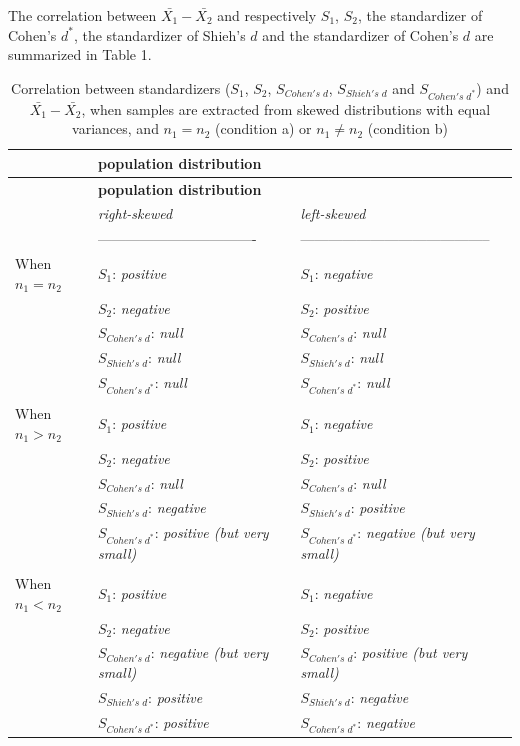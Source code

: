 \documentclass[
  english,
  man,mask]{apa6}
\begin{document}
The correlation between \(\bar{X_1}-\bar{X_2}\) and respectively \(S_1\), \(S_2\), the standardizer of Cohen's \(d^*\), the standardizer of Shieh's \(d\) and the standardizer of Cohen's \(d\) are summarized in Table 1.

\begin{longtable}[]{@{}
  >{\raggedright\arraybackslash}p{}
  >{\centering\arraybackslash}p{}
  >{\centering\arraybackslash}p{}@{}}
\caption{Correlation between standardizers (\(S_1\), \(S_2\), \(S_{Cohen's \; d}\), \(S_{Shieh's \; d}\) and \(S_{Cohen's \; d^*}\)) and \(\bar{X_1}-\bar{X_2}\), when samples are extracted from skewed distributions with equal variances, and \(n_1=n_2\) (condition a) or \(n_1 \neq n_2\) (condition b)}\tabularnewline
\toprule
& \textbf{\textbf{population distribution}} & \\
\midrule
\endfirsthead
\toprule
& \textbf{\textbf{population distribution}} & \\
\midrule
\endhead
& \emph{right-skewed} & \emph{left-skewed} \\
& ---------------------------------- & ----------------------------------------- \\
When \(n_1=n_2\) & \(S_1\): \emph{positive} & \(S_1\): \emph{negative} \\
& \(S_2\): \emph{negative} & \(S_2\): \emph{positive} \\
& \(S_{Cohen's \; d}\): \emph{null} & \(S_{Cohen's \; d}\): \emph{null} \\
& \(S_{Shieh's \; d}\): \emph{null} & \(S_{Shieh's \; d}\): \emph{null} \\
& \(S_{Cohen's \; d^*}\): \emph{null} & \(S_{Cohen's \; d^*}\): \emph{null} \\
& & \\
When \(n_1>n_2\) & \(S_1\): \emph{positive} & \(S_1\): \emph{negative} \\
& \(S_2\): \emph{negative} & \(S_2\): \emph{positive} \\
& \(S_{Cohen's \; d}\): \emph{null} & \(S_{Cohen's \; d}\): \emph{null} \\
& \(S_{Shieh's \; d}\): \emph{negative} & \(S_{Shieh's \; d}\): \emph{positive} \\
& \(S_{Cohen's \; d^*}\): \emph{positive (but very small)} & \(S_{Cohen's \; d^*}\): \emph{negative (but very small)} \\
& & \\
When \(n_1<n_2\) & \(S_1\): \emph{positive} & \(S_1\): \emph{negative} \\
& \(S_2\): \emph{negative} & \(S_2\): \emph{positive} \\
& \(S_{Cohen's \; d}\): \emph{negative (but very small)} & \(S_{Cohen's \; d}\): \emph{positive (but very small)} \\
& \(S_{Shieh's \; d}\): \emph{positive} & \(S_{Shieh's \; d}\): \emph{negative} \\
& \(S_{Cohen's \; d^*}\): \emph{positive} & \(S_{Cohen's \; d^*}\): \emph{negative} \\
\bottomrule
\end{longtable}
\end{document}
